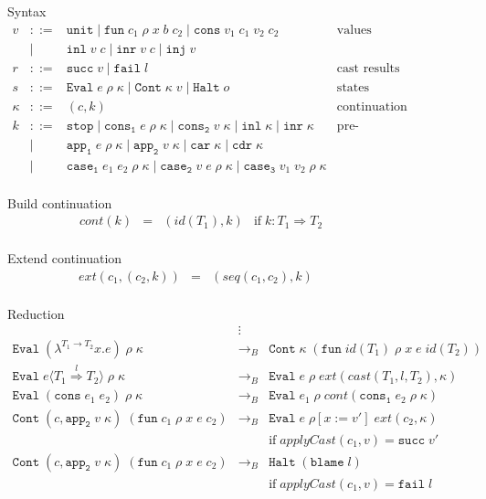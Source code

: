 \documentclass[acmsmall,review,anonymous]{acmart}\settopmatter{printfolios=true,printccs=false,printacmref=false}
\newcommand{\stxrule}[3]{#1 & ::= & #3 & \text{#2}\\}
\newcommand{\stxrulecont}[1]{& | & #1 & \\}
\newcommand{\funrule}[3]{#1 &=& #2 & #3\\}
\newcommand{\redrule}[3]{#1 & \longrightarrow_B & #2 & #3\\}
\newcommand{\sOOinspect}[3]{\mathtt{Eval} \; #1 \; #2 \; #3}
\newcommand{\sOOreturn}[2]{\mathtt{Cont} \; #2 \; #1}
\newcommand{\sOOhalt}[1]{\mathtt{Halt} \; #1}
\newcommand{\eOOlam}[4]{\lambda^{#1\rightarrow{}#2}#3.#4}
\newcommand{\eOOcons}[2]{\mathtt{cons} \; #1 \; #2}
\newcommand{\eOOcast}[4]{#1 \langle \cOOcast{#2}{#3}{#4} \rangle}
\newcommand{\oOOblame}[1]{\mathtt{blame} \; #1}
\newcommand{\cOOcast}[3]{#1 \overset{#2}{\Rightarrow} #3}
\newcommand{\rOOsucc}[1]{\mathtt{succ}\;#1}
\newcommand{\rOOfail}[1]{\mathtt{fail}\;#1}
\newcommand{\hcvOOinj}[2]{\mathtt{inj} \; #2}
\newcommand{\hcvOOfun}[5]{\mathtt{fun} \; #1 \; #2 \; #3 \; #4 \; #5}
\newcommand{\hcvOOtt}[0]{\mathtt{unit}}
\newcommand{\hcvOOcons}[4]{\mathtt{cons}\;#1\;#2\;#3\;#4}
\newcommand{\hcvOOinl}[2]{\mathtt{inl}\;#1\;#2}
\newcommand{\hcvOOinr}[2]{\mathtt{inr}\;#1\;#2}
\newcommand{\hckOOmt}[0]{\mathtt{stop}}
\newcommand{\hckOOconsI}[3]{\mathtt{cons_1}\;#1\;#2\;#3}
\newcommand{\hckOOappII}[2]{\mathtt{app_2}\;#1\;#2}
\newcommand{\sidecond}[1]{\text{if}\;#1}
\begin{document}
\begin{figure}
	Syntax
	\[
	\begin{array}{rclr}
	
	\stxrule{v}{values}{
		\hcvOOtt \mid
		\hcvOOfun{c_1}{\rho}{x}{b}{c_2} \mid
		\hcvOOcons{v_1}{c_1}{v_2}{c_2}
	}
	\stxrulecont{
		\hcvOOinl{v}{c} \mid
		\hcvOOinr{v}{c} \mid
		\hcvOOinj{P}{v}
	}
	\stxrule{r}{cast results}{
		\rOOsucc{v} \mid
		\rOOfail{l}
	}
	\stxrule{s}{states}{
		\sOOinspect{e}{\rho}{\kappa} \mid{}
		\sOOreturn{v}{\kappa} \mid{}
		\sOOhalt{o}
	}
	\stxrule{\kappa}{continuation}{
		(c,k)
	}
	\stxrule{k}{pre-continuations}{
		\hckOOmt \mid{}
		\mathtt{cons_1} \; e \; \rho \; \kappa \mid{}
		\mathtt{cons_2} \; v \; \kappa \mid{}
		\mathtt{inl} \; \kappa \mid{}
		\mathtt{inr} \; \kappa
	}
	\stxrulecont{
		\mathtt{app_1} \; e \; \rho \; \kappa \mid{}
		\mathtt{app_2} \; v \; \kappa \mid{}
		\mathtt{car} \; \kappa \mid{}
		\mathtt{cdr} \; \kappa
	}
	\stxrulecont{
		\mathtt{case_1} \; e_1 \; e_2 \; \rho \; \kappa \mid
		\mathtt{case_2} \; v   \; e   \; \rho \; \kappa \mid{}
		\mathtt{case_3} \; v_1 \; v_2 \; \rho \; \kappa
	}
	\end{array}
	\]
	
	Build continuation 
	\[
	\begin{array}{rclc}
	\funrule{cont(k)}{(id(T_1),k)}{
		\sidecond{k : T_1 \Longrightarrow T_2}}
	\end{array}
	\]
	
	Extend continuation 
	\[
	\begin{array}{rclc}
	\funrule{ext(c_1,(c_2,k))}{(seq(c_1,c_2),k)}{}
	\end{array}
	\]
	
	Reduction 
	\[
	\begin{array}{rclr}
	& \vdots \\
	\redrule{
		\sOOinspect{(\eOOlam{T_1}{T_2}{x}{e})}{\rho}{\kappa}
	}{
		\sOOreturn{(\hcvOOfun{id(T_1)}{\rho}{x}{e}{id(T_2)})}{\kappa}
	}{}
	\redrule{
		\sOOinspect{\eOOcast{e}{T_1}{l}{T_2}}{\rho}{\kappa}
	}{
		\sOOinspect{e}{\rho}{ext(cast(T_1,l,T_2),\kappa)}
	}{}
	\redrule{
		\sOOinspect{(\eOOcons{e_1}{e_2})}{\rho}{\kappa}
	}{
		\sOOinspect{e_1}{\rho}{cont(\hckOOconsI{e_2}{\rho}{\kappa})}
	}{}
	\redrule{
		\sOOreturn{(\hcvOOfun{c_1}{\rho}{x}{e}{c_2})}{(c,\hckOOappII{v}{\kappa})}
	}{
		\sOOinspect{e}{\rho[x:=v']}{ext(c_2,\kappa)}
	}{
		\\ & &
		\sidecond{applyCast(c_1,v) = \rOOsucc{v'}}
	}
	\redrule{
		\sOOreturn{(\hcvOOfun{c_1}{\rho}{x}{e}{c_2})}{(c,\hckOOappII{v}{\kappa})}
	}{
		\sOOhalt{(\oOOblame{l})}
	}{
		\\ & &
		\sidecond{applyCast(c_1,v) = \rOOfail{l}}
	}
	\end{array}
	\]
	

\end{figure}
\end{document}
